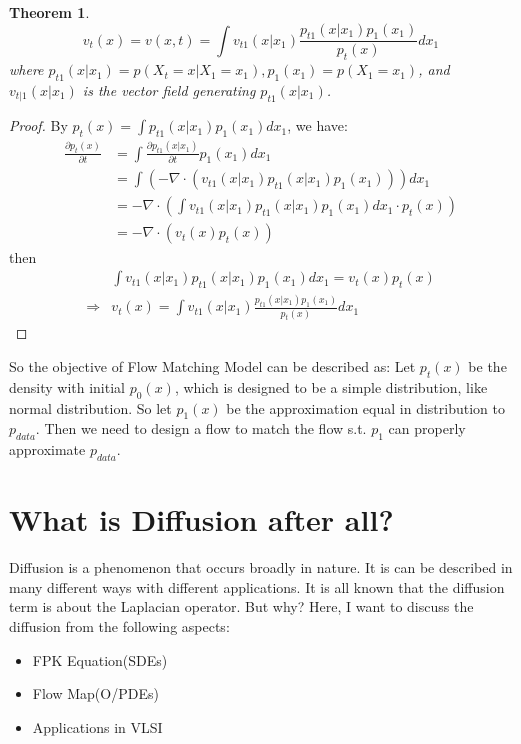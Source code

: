 \documentclass{article}
\newtheorem{theorem}{Theorem}
\newtheorem{proof}{Proof}
\begin{document}
\begin{theorem}
    \begin{equation}
        v_t(x)=v(x, t) = \int v_{t1}(x|x_1)\frac{p_{t1}(x|x_1)p_1(x_1)}{p_t(x)}dx_1
    \end{equation}
    where $p_{t1}(x|x_1)=p(X_t=x|X_1=x_1), p_1(x_1)=p(X_1=x_1)$, and $v_{t|1}(x|x_1)$ is the vector field generating $p_{t1}(x|x_1)$.
\end{theorem}
\begin{proof}
    By $p_t(x) = \int p_{t1}(x|x_1)p_1(x_1)dx_1$, we have:
    \begin{equation}
        \begin{aligned}
            \frac{\partial p_t(x)}{\partial t} &= \int \frac{\partial p_{t1}(x|x_1)}{\partial t}p_1(x_1)dx_1\\
            &= \int \left(-\nabla\cdot\left(v_{t1}(x|x_1)p_{t1}(x|x_1)p_1(x_1)\right)\right)dx_1\\
            &= -\nabla\cdot\left(\int v_{t1}(x|x_1)p_{t1}(x|x_1)p_1(x_1)dx_1\cdot p_t(x)\right)\\
            &= -\nabla\cdot\left(v_t(x)p_t(x)\right)
        \end{aligned}
    \end{equation}
then 
\begin{equation}
    \begin{aligned}
        &\int v_{t1}(x|x_1)p_{t1}(x|x_1)p_1(x_1)dx_1=v_t(x)p_t(x)\\
        \Rightarrow &v_t(x) = \int v_{t1}(x|x_1)\frac{p_{t1}(x|x_1)p_1(x_1)}{p_t(x)}dx_1
    \end{aligned}
\end{equation}
\end{proof}

So the objective of Flow Matching Model can be described as: Let $p_t(x)$ be the density with initial $p_0(x)$, which is designed to be a simple distribution, like normal distribution. 
So let $p_1(x)$ be the approximation equal in distribution to$ p_{data}$. Then we need to design a flow to match the flow s.t. $p_1$ can properly approximate $p_{data}$.


\section{What is Diffusion after all?}
Diffusion is a phenomenon that occurs broadly in nature. 
It is can be described in many different ways with different applications. 
It is all known that the diffusion term is about the Laplacian operator. But why? 
Here, I want to discuss the diffusion from the following aspects:
\begin{itemize}
    \item FPK Equation(SDEs)
    \item Flow Map(O/PDEs)
    \item Applications in VLSI
\end{itemize}
\end{document}
